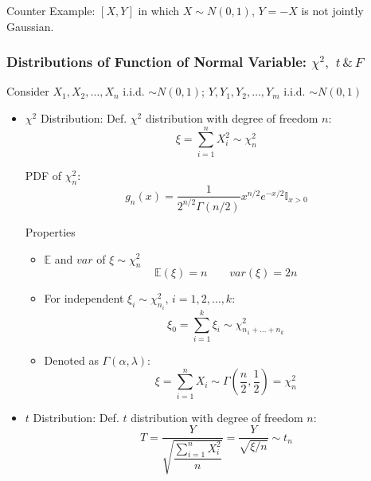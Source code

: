     Counter Example: $ [X,Y] $ in which $ X\sim N(0,1) $, $ Y=-X $ is not jointly Gaussian.
    
    
    

    \subsubsection{Distributions of Function of Normal Variable: $\chi^2,$ $t\,\& \,F$}\label{chi2_t_F_properties}
        Consider $X_1,X_2,\ldots,X_n$ i.i.d. $\sim N(0,1)$; $Y,Y_1,Y_2,\ldots,Y_m$ i.i.d. $\sim N(0,1)$
        \begin{itemize}
            \item $\chi^2$ Distribution: Def. $\chi^2$ distribution with degree of freedom $n$:
            \begin{equation}        
                \xi =\sum_{i=1}^n X_i^2\sim \chi^2_n
            \end{equation}

            PDF of $\chi^2_n$:
            \begin{equation}        
                g_n(x)=\dfrac{1}{2^{n/2}\Gamma(n/2)}x^{n/2}e^{-x/2}\mathbb{I}_{x>0}  
            \end{equation}

            Properties
            \begin{itemize}
                \item $\mathbb{E}$ and $var$ of $\xi\sim\chi^2_n$
                \begin{equation}            \mathbb{E}(\xi)=n\qquad var(\xi)=2n\end{equation}
                \item For independent $\xi_i\sim\chi^2_{n_i},\, i=1,2,\ldots,k$:\begin{equation}            
                    \xi_0=\sum_{i=1}^k\xi_i\sim\chi^2_{n_1+\ldots+n_k}\end{equation}
                \item Denoted as $\Gamma(\alpha,\lambda)$: \begin{equation}            \xi=\sum_{i=1}^nX_i\sim\Gamma(\frac{n}{2},\frac{1}{2})=\chi^2_n\end{equation}
            \end{itemize}
            \item $t$ Distribution: Def. $t$ distribution with degree of freedom $n$:
            \begin{equation}        
                T=\frac{Y}{\sqrt{\dfrac{\sum_{i=1}^nX_i^2}{n}}}=\frac{Y}{\sqrt{\xi \big/ n}}\sim t_n
            \end{equation}


\end{itemize}
